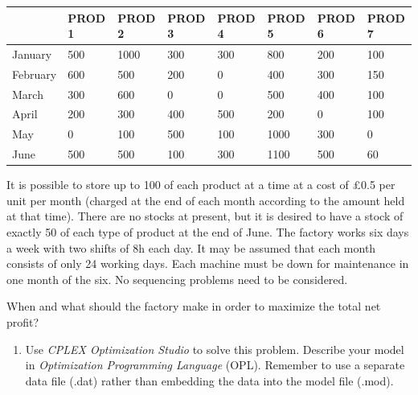 \documentclass[12pt,a4paper]{article}
\theoremstyle{definition}
\begin{document}
\begin{enumerate}
	\begin{table}[htbp]
		\scriptsize
		\centering
		\renewcommand\arraystretch{1.1}
		\begin{tabular}{m{} m{}<{\centering} m{}<{\centering} m{}<{\centering} m{}<{\centering} m{}<{\centering} m{}<{\centering} m{}<{\centering}}
			\hline
			& \textbf{PROD 1} & \textbf{PROD 2} & \textbf{PROD 3} & \textbf{PROD 4} & \textbf{PROD 5} & \textbf{PROD 6} &  \textbf{PROD 7} \\\hline
			January & 500 & 1000 & 300 & 300 & 800 & 200 & 100 \\
			February & 600 & 500 & 200 & 0 & 400 & 300 & 150 \\
			March & 300 & 600 & 0 & 0 & 500 & 400 & 100 \\
			April & 200 & 300 & 400 & 500 & 200 & 0 & 100 \\
			May & 0 & 100 & 500 & 100 & 1000 & 300 & 0 \\
			June & 500 & 500 & 100 & 300 & 1100 & 500 & 60 \\
			\hline
		\end{tabular}
	\end{table}
	
	It is possible to store up to 100 of each product at a time at a cost of \pounds0.5 per unit per month (charged at the end of each month according to the amount held at that time). There are no stocks at present, but it is desired to have a stock of exactly 50 of each type of product at the end of June. The factory works six days a week with two shifts of 8h each day. It may be assumed that each month consists of only 24 working days. Each machine must be down for maintenance in one month of the six. No sequencing problems need to be considered.
	
	When and what should the factory make in order to maximize the total net profit?
	
	\begin{enumerate}
		\item
		Use \emph{CPLEX Optimization Studio} to solve this problem. Describe your model in \emph{Optimization Programming Language} (OPL). Remember to use a separate data file (.dat) rather than embedding the data into the model file (.mod).
		

\end{enumerate}
\end{enumerate}
\end{document}
